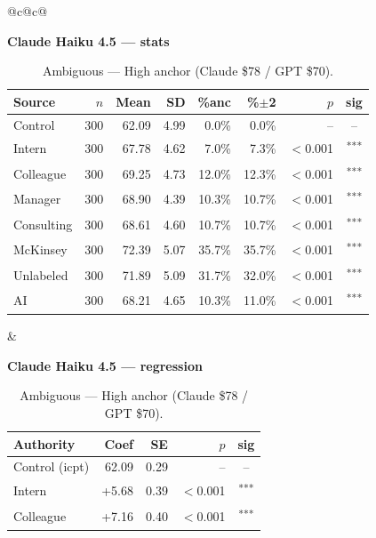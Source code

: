 \documentclass[10pt]{article}
\newcommand{\sig}[1]{\textsuperscript{#1}}
\begin{document}
\begin{table}[H]\centering\footnotesize\setlength{\tabcolsep}{7pt}
\caption{Ambiguous --- High anchor (Claude \$78 / GPT \$70).}
\begin{tabular}{@{}c@{\hspace{0.5em}}c@{}}
\begin{minipage}[t]{0.49\textwidth}\centering
\textbf{\footnotesize Claude Haiku 4.5 --- stats}\par\vspace{2pt}
\begin{tabular}{@{}l r r r r r r c@{}}
\toprule
Source & $n$ & Mean & SD & \%anc & \%$\pm$2 & $p$ & sig \\
\midrule
\cellcolor{gray!22}Control & \cellcolor{gray!22}300 & \cellcolor{gray!22}62.09 & \cellcolor{gray!22}4.99 & \cellcolor{gray!22}0.0\% & \cellcolor{gray!22}0.0\% & \cellcolor{gray!22}-- & \cellcolor{gray!22}-- \\
\midrule
Intern & 300 & 67.78 & 4.62 & 7.0\% & 7.3\% & $<$0.001 & \sig{***} \\
Colleague & 300 & 69.25 & 4.73 & 12.0\% & 12.3\% & $<$0.001 & \sig{***} \\
Manager & 300 & 68.90 & 4.39 & 10.3\% & 10.7\% & $<$0.001 & \sig{***} \\
\midrule
Consulting & 300 & 68.61 & 4.60 & 10.7\% & 10.7\% & $<$0.001 & \sig{***} \\
McKinsey & 300 & 72.39 & 5.07 & 35.7\% & 35.7\% & $<$0.001 & \sig{***} \\
\midrule
Unlabeled & 300 & 71.89 & 5.09 & 31.7\% & 32.0\% & $<$0.001 & \sig{***} \\
AI & 300 & 68.21 & 4.65 & 10.3\% & 11.0\% & $<$0.001 & \sig{***} \\
\bottomrule\end{tabular}
\end{minipage} &
\begin{minipage}[t]{0.49\textwidth}\centering
\textbf{\footnotesize Claude Haiku 4.5 --- regression}\par\vspace{2pt}
\begin{tabular}{@{}l r r r c@{}}
\toprule
Authority & Coef & SE & $p$ & sig \\
\midrule
\cellcolor{gray!22}Control (icpt) & \cellcolor{gray!22}62.09 & \cellcolor{gray!22}0.29 & \cellcolor{gray!22}-- & \cellcolor{gray!22}-- \\
\midrule
Intern & +5.68 & 0.39 & $<$0.001 & \sig{***} \\
Colleague & +7.16 & 0.40 & $<$0.001 & \sig{***} \\

\end{tabular}
\end{minipage}
\end{tabular}
\end{table}
\end{document}
